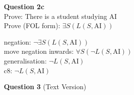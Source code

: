 \documentclass[12pt,a4paper]{article}
\begin{document}
\vspace{1em}

\textbf{Question 2c} \\

Prove: There is a student studying AI \\ 
\indent Prove (FOL form): $\exists S (L(S, \text{AI}))$

\vspace{1em}

\indent negation: $\neg \exists S (L(S, \text{AI}))$ \\ 
\indent move negation inwards: $\forall S (\neg L(S, \text{AI}))$ \\ 
\indent generalisation: $\neg L(S, \text{AI})$ \\
\indent c8: $\neg L(S, \text{AI})$

{\tiny
\begin{center}
\end{center}
}

\vspace{1em}


\newpage
\textbf{Question 3} (Text Version) \\
\end{document}
